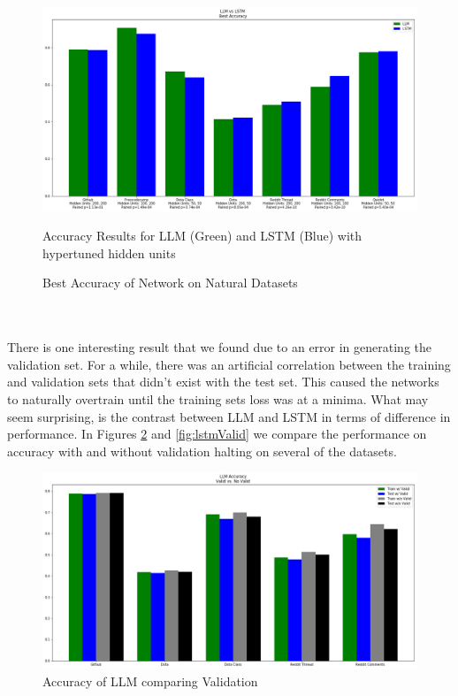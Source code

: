 \begin{figure}
    \centering
    \includegraphics[width=1.0\textwidth]{figures/Data_Results_Best.png}
    \caption{Best Accuracy of Network on Natural Datasets}
    \label{fig:resBest}
    Accuracy Results for LLM (Green) and LSTM (Blue) with hypertuned hidden units
\end{figure}
\\\\
There is one interesting result that we found due to an error in generating the validation set. For a while, there was an artificial correlation between the training and validation sets that didn't exist with the test set. This caused the networks to naturally overtrain until the training sets loss was at a minima. What may seem surprising, is the contrast between LLM and LSTM in terms of difference in performance. In Figures \ref{fig:llmValid} and \ref{fig:lstmValid} we compare the performance on accuracy with and without validation halting on several of the datasets.
\begin{figure}
    \centering
    \includegraphics[width=1.0\textwidth]{figures/LLM_Valid.png}
    \caption{Accuracy of LLM comparing Validation}
    \label{fig:llmValid}
\end{figure}

